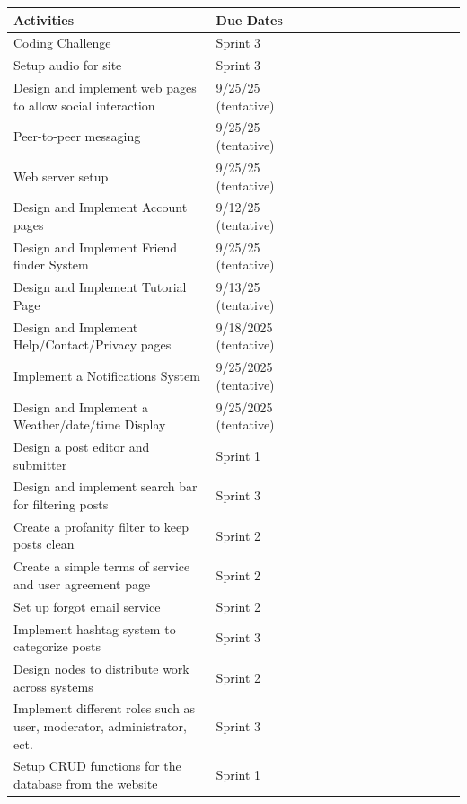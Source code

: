 \documentclass[10pt,titlepage]{article}
\begin{document}
	\begin{table}[!ht]
		\centering
		\begin{tabular}{|l|l|l|l|l|l|l|l|l|l|l|l|l|l|l|}
			\hline
			\textbf{Activities} & \textbf{Due Dates} \\ \hline
			Coding Challenge  & Sprint 3  \\ \hline
			Setup audio for site  & Sprint 3  \\ \hline
			Design and implement web pages to allow social interaction  & 9/25/25 (tentative)  \\ \hline
			Peer-to-peer messaging & 9/25/25 (tentative)  \\ \hline
			Web server setup & 9/25/25 (tentative)  \\ \hline
			Design and Implement Account pages & 9/12/25 (tentative) \\ \hline
			Design and Implement Friend finder System & 9/25/25 (tentative) \\ \hline
			Design and Implement Tutorial Page & 9/13/25 (tentative) \\ \hline
			Design and Implement Help/Contact/Privacy pages & 9/18/2025 (tentative) \\ \hline
			Implement a Notifications System & 9/25/2025 (tentative) \\ \hline
			Design and Implement a Weather/date/time Display & 9/25/2025 (tentative) \\ \hline
		  	Design a post editor and submitter & Sprint 1 \\ \hline
			Design and implement search bar for filtering posts & Sprint 3 \\ \hline
			Create a profanity filter to keep posts clean & Sprint 2 \\ \hline
			Create a simple terms of service and user agreement page & Sprint 2 \\ \hline
            Set up forgot email service & Sprint 2 \\ \hline
            Implement hashtag system to categorize posts & Sprint 3 \\ \hline
            Design nodes to distribute work across systems & Sprint 2 \\ \hline
            Implement different roles such as user, moderator, administrator, ect. & Sprint 3 \\ \hline
            Setup CRUD functions for the database from the website & Sprint 1 \\ \hline
		\end{tabular}
	\end{table}
	
\end{document}
